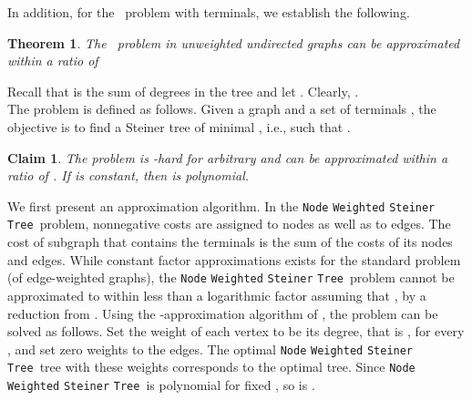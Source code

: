 \documentclass[12pt]{article}
\newtheorem{theorem}{Theorem}[section]
\newtheorem{claim}{Claim}[section]
\def\Proof{\par\noindent{\bf Proof:~}}
\newcommand{\PS}[0]{ 
}
\newcommand{\NodeSteiner}[0]{\mbox{\tt Node} \mbox{\tt Weighted}
\mbox{\tt Steiner} \mbox{\tt Tree}}
\begin{document}
In addition, for the \PS\ problem with  terminals, we establish the following.
\begin{theorem}
\label{thm:steiner_delta_approx}
The \PS\ problem in unweighted undirected graphs can be approximated within a ratio of

\end{theorem}
Recall that  is the sum of degrees in the tree  and
let . Clearly, . \\The  problem is defined as follows. Given a graph  and a set of terminals , the objective is to find a Steiner tree  of minimal , i.e., such that .
\begin{claim}
\label{cl:degcost_approx}
The  problem is -hard for arbitrary  and can be approximated within a ratio of . If  is constant, then  is polynomial.
\end{claim}
\Proof
We first present an  approximation algorithm.
In the \NodeSteiner\ problem, nonnegative costs are assigned to nodes as well as to edges. The cost of subgraph  that contains the terminals  is the sum of the costs of its nodes and edges. While constant factor approximations exists for the standard  problem (of edge-weighted graphs), the \NodeSteiner\ problem cannot be approximated to within less than a logarithmic factor  assuming that , by a reduction from  \cite{Feige98,KleinR95}.
Using the -approximation algorithm of  \cite{Feige98}, the  problem can be solved as follows. Set the weight of each vertex to be its degree, that is , for every , and set zero weights to the edges.
The optimal \NodeSteiner\ tree with these weights corresponds to the optimal  tree. Since \NodeSteiner\ is polynomial for fixed , so is  \cite{KleinR95}.
\end{document}
